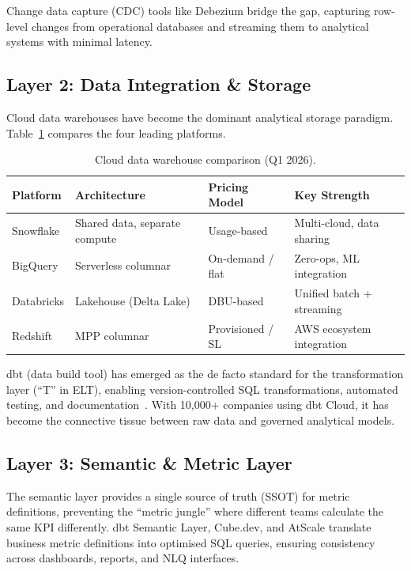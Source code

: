 \documentclass[12pt, a4paper]{article}
\begin{document}
Change data capture (CDC) tools like Debezium bridge the gap, capturing row-level changes from operational databases and streaming them to analytical systems with minimal latency.

\subsection{Layer 2: Data Integration \& Storage}
Cloud data warehouses have become the dominant analytical storage paradigm. Table~\ref{tab:warehouses} compares the four leading platforms.

\begin{table}[ht]
\centering
\caption{Cloud data warehouse comparison (Q1 2026).}
\label{tab:warehouses}
\begin{tabular}{l >{\raggedright\arraybackslash}p{4.5cm} >{\raggedright\arraybackslash}p{3.0cm} >{\raggedright\arraybackslash}p{4.0cm}}
\toprule
\textbf{Platform} & \textbf{Architecture} & \textbf{Pricing Model} & \textbf{Key Strength} \\
\midrule
Snowflake     & Shared data, separate compute & Usage-based       & Multi-cloud, data sharing \\
BigQuery      & Serverless columnar            & On-demand / flat  & Zero-ops, ML integration \\
Databricks    & Lakehouse (Delta Lake)         & DBU-based         & Unified batch + streaming \\
Redshift      & MPP columnar                   & Provisioned / SL  & AWS ecosystem integration \\
\bottomrule
\end{tabular}
\end{table}

dbt (data build tool) has emerged as the de facto standard for the transformation layer (``T'' in ELT), enabling version-controlled SQL transformations, automated testing, and documentation~\citep{dbt2024}. With 10,000+ companies using dbt Cloud, it has become the connective tissue between raw data and governed analytical models.

\subsection{Layer 3: Semantic \& Metric Layer}
The semantic layer provides a single source of truth (SSOT) for metric definitions, preventing the ``metric jungle'' where different teams calculate the same KPI differently. dbt Semantic Layer, Cube.dev, and AtScale translate business metric definitions into optimised SQL queries, ensuring consistency across dashboards, reports, and NLQ interfaces.
\end{document}
